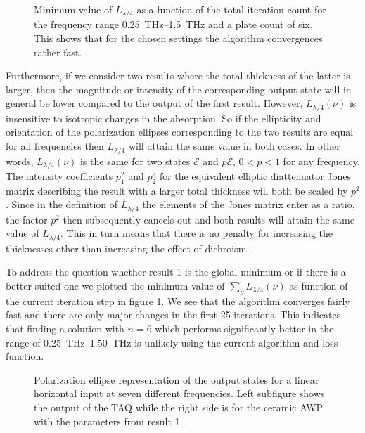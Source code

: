 \begin{figure}[h]
    \centering
    
    \caption{Minimum value of $L_{\lambda/4}$ as a function of the total iteration count for the frequency range \SIrange{0.25}{1.5}{\tera \hertz} and a plate count of six. This shows that for the chosen settings the algorithm convergences rather fast.}
    \label{fig:cl4_convergence}
\end{figure}


Furthermore, if we consider two results where the total thickness of the latter is larger, then the magnitude or intensity of the corresponding output state will in general be lower compared to the output of the first result. However, $L_{\lambda/4}(\nu)$ is insensitive to isotropic changes in the absorption. So if the ellipticity and orientation of the polarization ellipses corresponding to the two results are equal for all frequencies then $L_{\lambda/4}$ will attain the same value in both cases. In other words, $L_{\lambda/4}(\nu)$ is the same for two states $\bm{\mathcal{E}}$ and $p\bm{\mathcal{E}}$, $0<p<1$ for any frequency. The intensity coefficients $p_1^2$ and $p_2^2$ for the equivalent elliptic diattenuator Jones matrix describing the result with a larger total thickness will both be scaled by $p^2$. Since in the definition of $L_{\lambda/4}$ the elements of the Jones matrix enter as a ratio, the factor $p^2$ then subsequently cancels out and both results will attain the same value of $L_{\lambda/4}$. This in turn means that there is no penalty for increasing the thicknesses other than increasing the effect of dichroism. 

To address the question whether result 1 is the global minimum or if there is a better suited one we plotted the minimum value of $\sum_{\nu}L_{\lambda/4}(\nu)$ as function of the current iteration step in figure  \ref{fig:cl4_convergence}. We see that the algorithm converges fairly fast and there are only major changes in the first 25 iterations. This indicates that finding a solution with $n=6$ which performs significantly better in the range of \SIrange{0.25}{1.50}{\tera \hertz} is unlikely using the current algorithm and loss function.

\begin{figure}[ht]
    \centering
    
    \caption{Polarization ellipse representation of the output states for a linear horizontal input at seven different frequencies. Left subfigure shows the output of the TAQ while the right side is for the ceramic AWP with the parameters from result 1.}
    \label{fig:cl4_pe_lp}
\end{figure}

